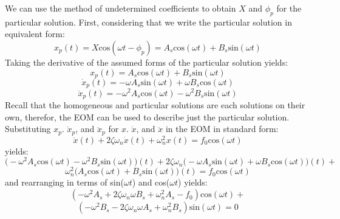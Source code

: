 \documentclass[12pt,letter]{article}
\numberwithin{ex}{section} %
\numberwithin{re}{section} %
\begin{document}
			We can use the method of undetermined coefficients to obtain $X$ and $\phi_p$ for the particular solution. First, considering that we write the particular solution in equivalent form:
			\begin{equation}
				x_p(t) = X \text{cos}(\omega t - \phi_p) = A_s \text{cos}(\omega t) + B_s  \text{sin}(\omega t)
			\end{equation}			 
			Taking the derivative of the assumed forms of the particular solution yields:
			\begin{equation}
				x_p(t) = A_s \text{cos}(\omega t) + B_s  \text{sin}(\omega t)
			\end{equation}	
			\begin{equation}
				\dot{x}_p(t) = -\omega A_s \text{sin}(\omega t) + \omega B_s  \text{cos}(\omega t)
			\end{equation}				 
			\begin{equation}
				\ddot{x}_p(t) = -\omega^2 A_s \text{cos}(\omega t) - \omega^2 B_s  \text{sin}(\omega t)
			\end{equation}				
			Recall that the homogeneous and particular solutions are each solutions on their own, therefor, the EOM can be used to describe just the particular solution. Substituting $x_p$. $\dot{x}_p$, and $\ddot{x}_p$ for $x$. $\dot{x}$, and $\ddot{x}$ in the EOM in standard form:
			\begin{equation}
			 	\ddot{x}(t)+2 \zeta \omega_n \dot{x}(t) +\omega_n^2x(t) = f_0\text{cos}(\omega t)
			\end{equation}
			yields:
			\begin{equation}
			 	\big(	-\omega^2 A_s \text{cos}(\omega t) - \omega^2 B_s  \text{sin}(\omega t) \big)(t)+2 \zeta \omega_n  \big( -\omega A_s \text{sin}(\omega t) + \omega B_s  \text{cos}(\omega t)  \big) (t) +
			\end{equation}
			\begin{equation*}
				\omega_n^2 \big( A_s \text{cos}(\omega t) + B_s  \text{sin}(\omega t) \big)(t) = f_0\text{cos}(\omega t)
			\end{equation*}				
			and rearranging in terms of sin($\omega t$) and cos($\omega t$) yields: 
			\begin{equation}
				(-\omega^2 A_s + 2 \zeta \omega_n \omega B_s + \omega_n^2 A_s -f_0) \text{cos}(\omega t) + 
			\end{equation}
			\begin{equation*}
				(-\omega^2 B_s - 2 \zeta \omega_n \omega A_s + \omega_n^2 B_s)\text{sin}(\omega t) =0
			\end{equation*}	
\end{document}
